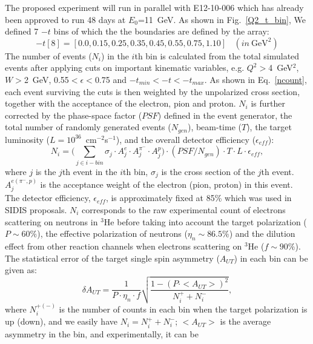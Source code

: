 The proposed experiment will run in parallel with E12-10-006 which has already
been approved to run 48 days at $E_{0}$=11~GeV.  As shown in
Fig.~\ref{Q2_t_bin}, We defined 7 $-t$ bins of which the the boundaries are
defined by the array:
 \begin{equation}
   -t[8] = [0.0, 0.15, 0.25, 0.35, 0.45, 0.55, 0.75, 1.10]~~~~(in~\mathrm{GeV^{2}})
 \end{equation}
The number of events ($N_{i}$) in the $i$th bin is calculated from the total
simulated events after applying cuts on important kinematic variables,
e.g. $Q^{2}>$4~GeV$^{2}$, $W>$2~GeV, 0.55$<\epsilon<$0.75 and
$-t_{min}<-t<-t_{max}$. As shown in Eq.~\ref{ncount}, each event surviving the
cuts is then weighted by the unpolarized cross section, together with the
acceptance of the electron, pion and proton. $N_{i}$ is further corrected by
the phase-space factor ($PSF$) defined in the event generator, the total number
of randomly generated events ($N_{gen}$), beam-time ($T$), the target
luminosity ($L=10^{36}$~cm$^{-2}$s$^{-1}$), and the overall detector efficiency 
($\epsilon_{eff}$):
 \begin{equation}
     N_{i} = \bigl(\sum_{j\in i-bin} \sigma_{j}\cdot A^{e}_{j} \cdot
     A^{\pi^{-}}_{j} \cdot A^{p}_{j}\bigr) \cdot (PSF/N_{gen}) \cdot T \cdot L \cdot
     \epsilon_{eff},
     \label{ncount}
 \end{equation}
where $j$ is the $j$th event in the $i$th bin, $\sigma_{j}$ is the cross
section of the $j$th event. $A^{e(\pi^{-},p)}_{j}$ is the acceptance weight of the
electron (pion, proton) in this event. The detector efficiency,
$\epsilon_{eff}$, is approximately fixed at 85\% which was used in SIDIS
proposals. $N_{i}$ corresponds to the raw experimental count of electrons
scattering on neutrons in $\mathrm{^{3}He}$ before taking into account the
target polarization ($P\sim60\%$), the effective polarization of neutrons
($\eta_{n}\sim86.5\%$) and the dilution effect from other reaction channels
when electrons scattering on $\mathrm{^{3}He}$ ($f \sim 90\%$). The statistical
error of the target single spin asymmetry ($A_{UT}$) in each bin can be given
as:
  \begin{equation}
    \delta A_{UT} = \frac{1}{P\cdot\eta_{n}\cdot f} \sqrt{\frac{1-(P\cdot
        <A_{UT}>)^{2}}{N^{+}_{i}+N^{-}_{i}}},
    \label{stat_err}
 \end{equation}
where $N^{+(-)}_{i}$ is the number of counts in each bin when the target
polarization is up (down), and we easily have $N_{i}=N^{+}_{i}+N^{-}_{i}$;
$<A_{UT}>$ is the average asymmetry in the bin, and experimentally, it can be
